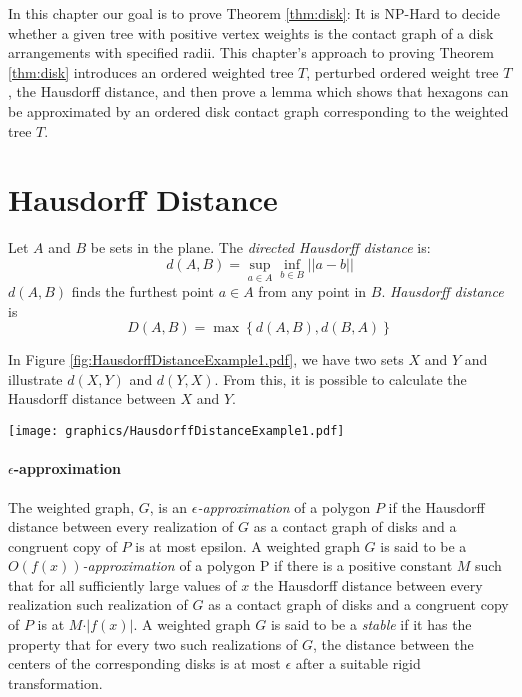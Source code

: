 \documentclass[10pt]{CSUNthesis}
\theoremstyle{plain}%
\theoremstyle{definition}
\theoremstyle{remark}
\newcommand{\lr}[1]{\left( #1 \right)}
\newcommand{\BigOh}[1]{O\left( #1 \right)}
\begin{document}
In this chapter our goal is to prove Theorem \ref{thm:disk}: It is NP-Hard to decide whether a given tree with positive vertex weights is the contact graph of a disk arrangements with specified radii.   
This chapter's approach to proving Theorem \ref{thm:disk} introduces an ordered weighted tree $T$, perturbed ordered weight tree $T$, the Hausdorff distance, and then prove a lemma which shows that hexagons can be approximated by an ordered disk contact graph corresponding to the weighted tree $T$.
\section{Hausdorff Distance}  
Let $A$ and $B$ be sets in the plane. The \textit{directed Hausdorff distance} is: 
\begin{equation}\label{eqn:ContactGraphV3-1}
d\lr{A,B} = \sup_{a \in A} \inf_{b \in B} \left\vert\left\vert a-b \right\vert \right\vert
\end{equation}
$d\lr{A,B}$ finds the furthest point $a \in A$ from any point in $B$.  \textit{Hausdorff distance} is
\begin{equation}\label{eqn:ContactGraphV3-2}
D\lr{A,B} = \max \left\lbrace d\lr{A,B}, d\lr{B,A} \right\rbrace
\end{equation}

In Figure \ref{fig:HausdorffDistanceExample1.pdf}, we have two sets $X$ and $Y$ and illustrate $d(X,Y)$ and $d(Y,X)$.  
From this, it is possible to calculate the Hausdorff distance between $X$ and $Y$.

\begin{minipage}{\linewidth}
\begin{center}
\texttt{[image: graphics/HausdorffDistanceExample1.pdf]}
\label{fig:HausdorffDistanceExample1.pdf}
\end{center}
\end{minipage}

\paragraph{$\epsilon$-approximation}
The weighted graph, $G$, is an \textit{$\epsilon$-approximation} of a polygon $P$ if the Hausdorff distance between every realization of $G$ as a contact graph of disks and a congruent copy of $P$ is at most epsilon.  
A weighted graph $G$ is said to be a \textit{$\BigOh{f(x)}$-approximation} of a polygon P if there is a positive constant $M$ such that for all sufficiently large values of $x$ the Hausdorff distance between every realization such realization of $G$ as a contact graph of disks and a congruent copy of $P$ is at $M \cdot \vert f(x)\vert$. 
A weighted graph $G$ is said to be a \textit{stable} if it has the property that for every two such realizations of $G$, the distance between the centers of the corresponding disks is at most $\epsilon$ after a suitable rigid transformation.
\end{document}

